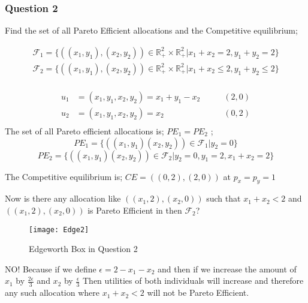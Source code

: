 \documentclass[12pt,a4paper]{article}
\begin{document}
\subsubsection*{Question 2}
Find the set of all Pareto Efficient allocations and the Competitive equilibrium;

\begin{equation*}
    \begin{split}
        \mathcal{F}_{1}= \{\left( (x_{1},y_{1}),(x_{2},y_{2}) \right) \in \mathbb{R}^2_{+} \times \mathbb{R}^2_{+} | x_{1}+x_{2}=2, y_{1}+y_{2}= 2 \}\\
        \mathcal{F}_{2}= \{\left( (x_{1},y_{1}) , (x_{2},y_{2}) \right) \in \mathbb{R}^2_{+} \times \mathbb{R}^2_{+} | x_{1}+x_{2}\leq 2 , y_{1}+y_{2}\leq 2\}\\ 
    \end{split}
\end{equation*}

\begin{align*}
    u_{1}&=(x_{1},y_{1},x_{2},y_{2})= x_{1}+y_{1}-x_{2} \qquad &(2,0) \\
    u_{2}&=(x_{1},y_{1},x_{2},y_{2})= x_{2} \qquad &(0,2)\\ 
\end{align*}
The set of all Pareto efficient allocations is; \(PE_{1}=PE_{2}\) ; 
\[PE_{1}=\{\left( (x_{1},y_{1})(x_{2},y_{2}) \right) \in \mathcal{F}_{1} |y_{2}=0\} \]
\[PE_{2}=\{\left( (x_{1},y_{1})(x_{2},y_{2}) \right) \in \mathcal{F}_{2} |y_{2}=0, y_{1}=2, x_{1}+x_{2}=2\} \]    

The Competitive equilibrium is;
\(CE= ((0,2),(2,0))\) at \(p_{x}=p_{y}=1\)

Now is there any allocation like
\(\left( (x_{1},2),(x_{2},0) \right) \) such that \(x_{1}+x_{2} < 2 \) and \(\left( (x_{1},2),(x_{2},0) \right) \)  is Pareto Efficient in then \(\mathcal{F}_{2}\)? 

\begin{center}
    \begin{figure}[h]
        \centering
        \texttt{[image: Edge2]}
        \caption{Edgeworth Box in Question 2}
        \label{Label}
    \end{figure}
\end{center}

NO! Because if we define \(\epsilon = 2-x_{1}-x_{2}\) and then if we increase the amount of \(x_{1}\) by \(\frac{2\epsilon}{3}\) and \(x_{2}\) by \(\frac{\epsilon}{3}      \) Then utilities of both individuals will increase and therefore any such allocation where \(x_{1}+x_{2}<2\) will not be Pareto Efficient.  
\end{document}
